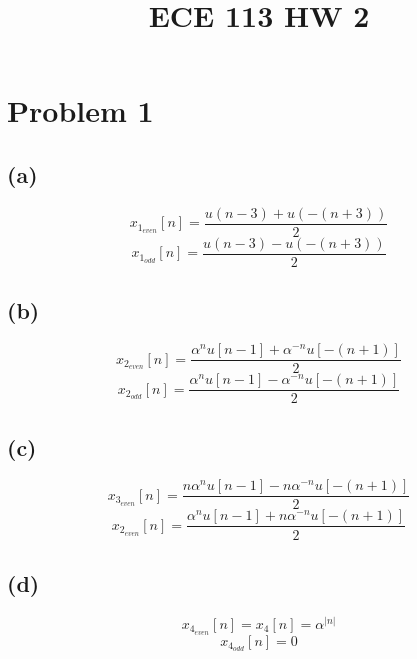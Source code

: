 
\title{ECE 113 HW 2}

\maketitle
\section*{Problem 1}
\subsection*{(a)}
$$x_{1_{even}}[n]=\frac{u(n-3)+u(-(n+3))}{2}$$
$$x_{1_{odd}}[n]=\frac{u(n-3)-u(-(n+3))}{2}$$
\subsection*{(b)}
$$x_{2_{even}}[n]=\frac{\alpha^nu[n-1]+\alpha^{-n}u[-(n+1)]}{2}$$
$$x_{2_{odd}}[n]=\frac{\alpha^nu[n-1]-\alpha^{-n}u[-(n+1)]}{2}$$
\subsection*{(c)}

$$x_{3_{even}}[n]=\frac{n\alpha^nu[n-1]-n\alpha^{-n}u[-(n+1)]}{2}$$
$$x_{2_{even}}[n]=\frac{\alpha^nu[n-1]+n\alpha^{-n}u[-(n+1)]}{2}$$
\subsection*{(d)}
$$x_{4_{even}}[n]=x_4[n]=\alpha^{|n|}$$
$$x_{4_{odd}}[n]=0$$


